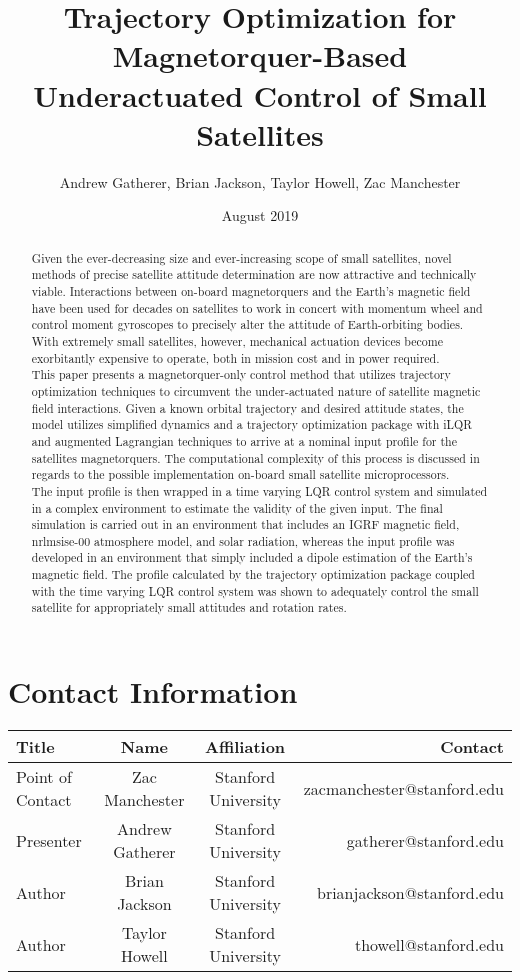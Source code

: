 \documentclass{article}
\begin{document}
\title{Trajectory Optimization for Magnetorquer-Based Underactuated Control of Small Satellites}
\author{Andrew Gatherer, Brian Jackson, Taylor Howell, Zac Manchester}
\date{August 2019}
\maketitle

\begin{abstract}
Given the ever-decreasing size and ever-increasing scope of small satellites, novel methods of precise satellite attitude determination are now attractive and technically viable. Interactions between on-board magnetorquers and the Earth's magnetic field have been used for decades on satellites to work in concert with momentum wheel and control moment gyroscopes to precisely alter the attitude of Earth-orbiting bodies. With extremely small satellites, however, mechanical actuation devices become exorbitantly expensive to operate, both in mission cost and in power required. \\
\indent This paper presents a magnetorquer-only control method that utilizes trajectory optimization techniques to circumvent the under-actuated nature of satellite magnetic field interactions. Given a known orbital trajectory and desired attitude states, the model utilizes simplified dynamics and a trajectory optimization package with iLQR and augmented Lagrangian techniques to arrive at a nominal input profile for the satellites magnetorquers. The computational complexity of this process is discussed in regards to the possible implementation on-board small satellite microprocessors. \\
\indent The input profile is then wrapped in a time varying LQR control system and simulated in a complex environment to estimate the validity of the given input. The final simulation is carried out in an environment that includes an IGRF magnetic field, nrlmsise-00 atmosphere model, and solar radiation, whereas the input profile was developed in an environment that simply included a dipole estimation of the Earth's magnetic field. The profile calculated by the trajectory optimization package coupled with the time varying LQR control system was shown to adequately control the small satellite for appropriately small attitudes and rotation rates. 

\end{abstract}

\section{Contact Information}
\begin{tabular}{l | c | c | r}
	\hline
	Title & Name & Affiliation & Contact\\
	\hline
	Point of Contact & Zac Manchester & Stanford University & zacmanchester@stanford.edu\\
	Presenter & Andrew Gatherer & Stanford University & gatherer@stanford.edu\\
	Author & Brian Jackson & Stanford University & brianjackson@stanford.edu\\
	Author & Taylor Howell & Stanford University & thowell@stanford.edu
\end{tabular}
	
\end{document}
